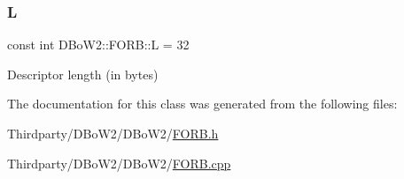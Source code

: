 \subsubsection{\texorpdfstring{L}{L}}
{\footnotesize\ttfamily const int D\+Bo\+W2\+::\+F\+O\+R\+B\+::L = 32\hspace{0.3cm}{\ttfamily [static]}}



Descriptor length (in bytes) 



The documentation for this class was generated from the following files\+:\begin{DoxyCompactItemize}
\item 
Thirdparty/\+D\+Bo\+W2/\+D\+Bo\+W2/\mbox{\hyperlink{_f_o_r_b_8h}{F\+O\+R\+B.\+h}}\item 
Thirdparty/\+D\+Bo\+W2/\+D\+Bo\+W2/\mbox{\hyperlink{_f_o_r_b_8cpp}{F\+O\+R\+B.\+cpp}}\end{DoxyCompactItemize}
